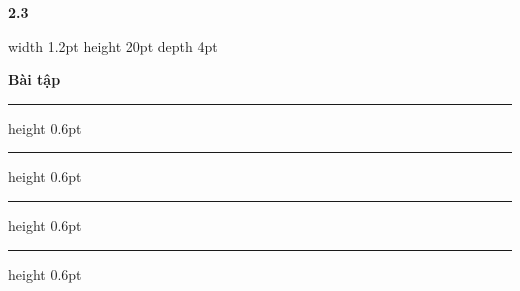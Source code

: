 \vspace{1.2em}

\noindent
\begin{minipage}{\textwidth}
    \parbox[c]{1.3cm}{\fontsize{22}{24}\selectfont\bfseries\color{stewartcyan}\textsf{2.3}}%
    {\color{stewartcyan}\vrule width 1.2pt height 20pt depth 4pt}\hspace{8pt}%
    \parbox[c]{2.6cm}{\fontsize{15}{18}\selectfont\bfseries\textsf{Bài tập}}%
    \hfill
    \parbox[c]{\dimexpr\textwidth - 4.5cm\relax}{%
        \color{stewartcyan!60}%
        \hrule height 0.6pt\vspace{2.5pt}%
        \hrule height 0.6pt\vspace{2.5pt}%
        \hrule height 0.6pt\vspace{2.5pt}%
        \hrule height 0.6pt%
    }
\end{minipage}

\vspace{0.8em}

